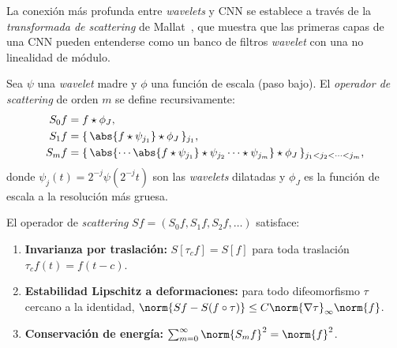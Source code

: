 La conexi\'on m\'as profunda entre \emph{wavelets} y CNN se establece a trav\'es
de la \emph{transformada de \emph{scattering}} de Mallat~\citep{Mallat2012scattering},
que muestra que las primeras capas de una CNN pueden entenderse como un banco de
filtros \emph{wavelet} con una no linealidad de m\'odulo.

\begin{definition}
\label{def:grids:scattering}
Sea $\psi$ una \emph{wavelet} madre y $\phi$ una funci\'on de escala (paso
bajo). El \emph{operador de \emph{scattering}} de orden $m$ se define
recursivamente:
\begin{align}
S_0 f &= f \star \phi_J, \nonumber \\
S_1 f &= \{\,\abs{f \star \psi_{j_1}} \star \phi_J\,\}_{j_1}, \nonumber \\
S_m f &= \{\,\abs{\cdots\abs{f \star \psi_{j_1}} \star \psi_{j_2}\cdots \star \psi_{j_m}} \star \phi_J\,\}_{j_1 < j_2 < \cdots < j_m},
\end{align}
donde $\psi_j(t) = 2^{-j}\psi(2^{-j}t)$ son las \emph{wavelets} dilatadas y
$\phi_J$ es la funci\'on de escala a la resoluci\'on m\'as gruesa.
\end{definition}

\begin{proposition}
\label{prop:grids:scattering}
El operador de \emph{scattering} $Sf = (S_0 f, S_1 f, S_2 f, \ldots)$ satisface:
\begin{enumerate}
  \item \textbf{Invarianza por traslaci\'on:} $S[\tau_c f] = S[f]$ para toda
    traslaci\'on $\tau_c f(t) = f(t - c)$.
  \item \textbf{Estabilidad Lipschitz a deformaciones:} para todo difeomorfismo
    $\tau$ cercano a la identidad,
    $\norm{Sf - S(f \circ \tau)} \leq C\norm{\nabla \tau}_\infty \norm{f}$.
  \item \textbf{Conservaci\'on de energ\'ia:} $\sum_{m=0}^{\infty} \norm{S_m f}^2 = \norm{f}^2$.
\end{enumerate}
\end{proposition}

